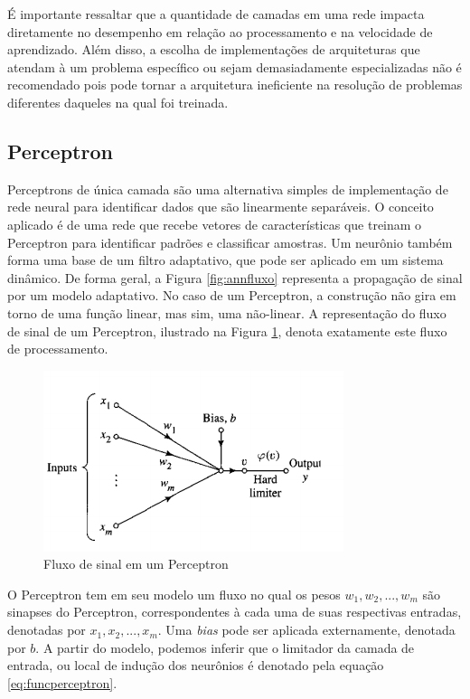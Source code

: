 É importante ressaltar que a quantidade de camadas em uma rede impacta diretamente no desempenho em relação ao processamento e na velocidade de aprendizado. Além disso, a escolha de implementações de arquiteturas que atendam à um problema específico ou sejam demasiadamente especializadas não é recomendado pois pode tornar a arquitetura ineficiente na resolução de problemas diferentes daqueles na qual foi treinada. 

\subsection{Perceptron}

Perceptrons de única camada são uma alternativa simples de implementação de rede neural para identificar dados que são linearmente separáveis. O conceito aplicado é de uma rede que recebe vetores de características que treinam o Perceptron para identificar padrões e classificar amostras. Um neurônio também forma uma base de um filtro adaptativo, que pode ser aplicado em um sistema dinâmico. De forma geral, a Figura \ref{fig:annfluxo} representa a propagação de sinal por um modelo adaptativo. No caso de um Perceptron, a construção não gira em torno de uma função linear, mas sim, uma não-linear. A representação do fluxo de sinal de um Perceptron, ilustrado na Figura \ref{fig:perceptron}, denota exatamente este fluxo de processamento. 
	
\begin{figure}[ht!]
	\caption{Fluxo de sinal em um Perceptron}
	\label{fig:perceptron}
	\begin{center}
		\includegraphics[scale=0.8]{img/perceptron.png}
	\end{center}
\end{figure}	

O Perceptron tem em seu modelo um fluxo no qual os pesos $w_1, w_2, ... , w_m$ são sinapses do Perceptron, correspondentes à cada uma de suas respectivas entradas, denotadas por $x_1, x_2, ... , x_m$. Uma \textit{bias} pode ser aplicada externamente, denotada por $b$. A partir do modelo, podemos inferir que o limitador da camada de entrada, ou local de indução dos neurônios é denotado pela equação \ref{eq:funcperceptron}.  

